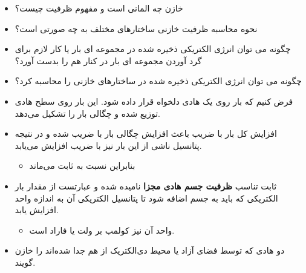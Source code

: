 \begin{ELunit}


\begin{itemize}
\item
  خازن چه المانی است و مفهوم ظرفیت چیست؟
\item
  نحوه محاسبه ظرفیت خازنی ساختارهای مختلف به چه صورتی است؟
\item
  چگونه می توان انرژی الکتریکی ذخیره شده در مجموعه ای بار یا کار لازم برای گرد آوردن مجموعه ای بار در کنار هم را بدست آورد؟
\item
  چگونه می توان انرژی الکتریکی ذخیره شده در ساختارهای خازنی را محاسبه کرد؟
\item
  فرض کنیم که بار  روی یک هادی دلخواه قرار داده شود. این بار روی سطح هادی توزیع شده و چگالی بار  را تشکیل می‌دهد.
\item
  افزایش کل بار با ضریب  باعث افزایش چگالی بار  با ضریب  شده و در نتیجه پتانسیل ناشی از این بار نیز با ضریب  افزایش می‌یابد.

  \begin{itemize}
  \tightlist
  \item
    بنابراین نسبت  به  ثابت می‌ماند
  \end{itemize}
\end{itemize}

\end{ELunit}

\begin{ELimportant}{}


\end{ELimportant}

\begin{ELunit}

\begin{itemize}
\tightlist
\item
  ثابت تناسب  \textbf{ظرفیت جسم هادی مجزا} نامیده شده و عبارتست از مقدار بار الکتریکی که باید به جسم اضافه شود تا پتانسیل الکتریکی آن به اندازه واحد افزایش یابد.

  \begin{itemize}
  \tightlist
  \item
    واحد آن نیز کولمب بر ولت یا فاراد  است.
  \end{itemize}
\item
  دو هادی که توسط فضای آزاد یا محیط دی‌الکتریک از هم جدا شده‌اند را خازن گویند.
\end{itemize}


\end{ELunit}

